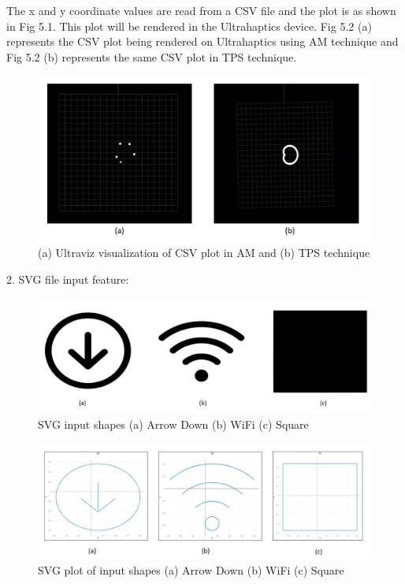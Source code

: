 The x and y coordinate values are read from a CSV file and the plot is as shown in Fig 5.1.
This plot will be rendered in the Ultrahaptics device. Fig 5.2 (a) represents the CSV plot being rendered on Ultrahaptics using AM technique and Fig 5.2 (b) represents the same CSV plot in TPS technique. 

\begin{figure}[H]
	\includegraphics[width=\textwidth]{gfx/read_csv_rendering.png}
	\caption{(a) Ultraviz visualization of CSV plot in AM and (b) TPS technique}
	\label{fig:validation:csv_am}
\end{figure}

2. SVG file input feature:
\begin{figure}[H]
	\includegraphics[width=\textwidth]{gfx/SVG Input.png}
	\caption{SVG input shapes (a) Arrow Down (b) WiFi (c) Square}
	\label{fig:validation:svg}
\end{figure}

\begin{figure}[H]
	\includegraphics[width=\textwidth]{gfx/svg_plot.png}
	\caption{SVG plot of input shapes (a) Arrow Down (b) WiFi (c) Square}
	\label{fig:validation:svg_plot}
\end{figure}

